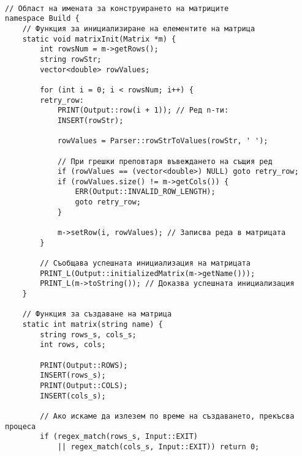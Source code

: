\documentclass[oneside]{book}
\begin{document}
\begin{mdframed}\begin{lstlisting}[firstnumber=last]

// Област на имената за конструирането на матриците
namespace Build {
	// Функция за инициализиране на елементите на матрица
	static void matrixInit(Matrix *m) {
		int rowsNum = m->getRows();
		string rowStr;
		vector<double> rowValues;

		for (int i = 0; i < rowsNum; i++) {
		retry_row:
			PRINT(Output::row(i + 1)); // Ред n-ти:
			INSERT(rowStr);

			rowValues = Parser::rowStrToValues(rowStr, ' ');

			// При грешки преповтаря въвеждането на същия ред
			if (rowValues == (vector<double>) NULL) goto retry_row;
			if (rowValues.size() != m->getCols()) {
				ERR(Output::INVALID_ROW_LENGTH);
				goto retry_row;
			}

			m->setRow(i, rowValues); // Записва реда в матрицата
		}

		// Съобщава успешната инициализация на матрицата
		PRINT_L(Output::initializedMatrix(m->getName()));
		PRINT_L(m->toString()); // Доказва успешната инициализация
	}

	// Функция за създаване на матрица
	static int matrix(string name) {
		string rows_s, cols_s;
		int rows, cols;

		PRINT(Output::ROWS);
		INSERT(rows_s);
		PRINT(Output::COLS);
		INSERT(cols_s);

		// Ако искаме да излезем по време на създаването, прекъсва процеса
		if (regex_match(rows_s, Input::EXIT) 
            || regex_match(cols_s, Input::EXIT)) return 0;
\end{lstlisting}\end{mdframed}
\pagebreak
\end{document}

